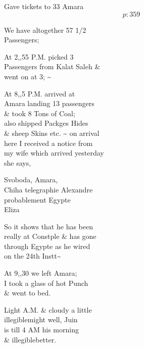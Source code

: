 \documentclass{report}
\begin{document}
	\par{
 	Gave tickets to 33 Amara\ \\
  \[p: 359 \]

	}

	\par{
 	We have altogether 57 1/2\ \\Passengers;\ \\
	}

	\par{
 	At 2,,55 P.M. picked 3\ \\Passengers from Kalat Saleh \&\ \\went on at 3; \~{}\ \\
	}

	\par{
 	At 8,,5 P.M. arrived at\ \\Amara landing 13 passengers\ \\\& took 8 Tons of Coal;\ \\also shipped Packges Hides\ \\\& sheep Skins etc. \~{} on arrival\ \\here I received a notice from\ \\my wife which arrived yesterday\ \\she says,\ \\
	}

	\par{
 	Svoboda, Amara,\ \\Chiha telegraphie Alexandre\ \\probablement Egypte\ \\Eliza\ \\
	}

	\par{
 	So it shows that he has been\ \\really at Constple \& has gone\ \\through Egypte as he wired\ \\on the 24th Instt\~{}\ \\
	}

	\par{
 	At 9,,30 we left Amara;\ \\I took a glass of hot Punch\ \\\& went to bed.\ \\
	}

	\par{
 	Light A.M. \& cloudy a little\ \\\lbrack illegible\rbrack might well, Juin\ \\is till 4 AM his morning\ \\\& \lbrack illegible\rbrack better.\ \\
	}
\end{document}
